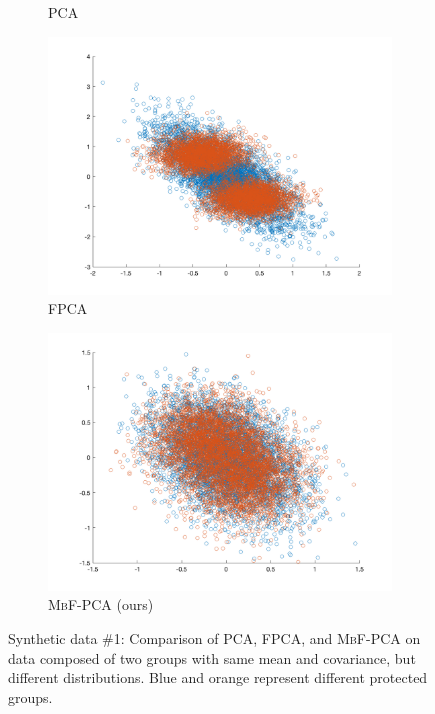 \documentclass{beamer}
\begin{document}
\begin{frame}
\begin{figure}[!t]
\begin{center}
\begin{subfigure}[t]{0.24\linewidth}
				\caption{\label{fig:PCA} PCA}
			\end{subfigure}\hfill
			\begin{subfigure}[t]{0.24\linewidth}
				\includegraphics[width=\linewidth]{figures/exp1-1/fpca.png}
				\caption{\label{fig:FPCA} \textsc{FPCA} \cite{OA19}}
			\end{subfigure}\hfill
			\begin{subfigure}[t]{0.24\linewidth}
				\includegraphics[width=\linewidth]{figures/exp1-1/mbfpca.png}
				\caption{\label{fig:ours} \textsc{MbF-PCA} (ours)}
			\end{subfigure}
			\caption{\label{fig:exp1-1} Synthetic data \#1: Comparison of PCA, FPCA, and \textsc{MbF-PCA} on data composed of two groups with same mean and covariance, but different distributions. Blue and orange represent different protected groups.}
		\end{center}
	\end{figure}
\end{frame}
\end{document}
